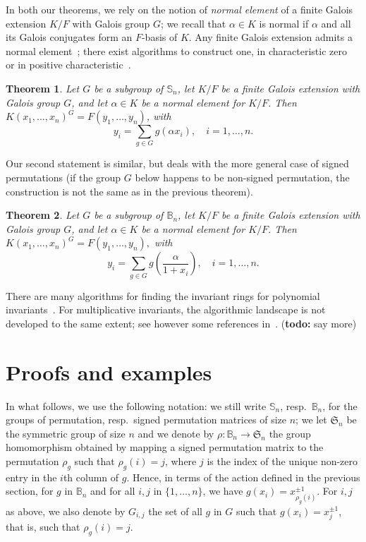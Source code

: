 \documentclass[12pt]{article}
\theoremstyle{plain}
\newtheorem{theorem}{Theorem}
\def\todo#1{(\textbf{todo:} #1)}
\begin{document}
In both our theorems, we rely on the notion of {\em normal element} of
a finite Galois extension $K/F$ with Galois group $G$; we recall that
$\alpha \in K$ is normal if $\alpha$ and all its Galois conjugates
form an $F$-basis of $K$.  Any finite Galois extension admits a normal
element~\cite[Theorem 6.13.1]{Lang}; there exist algorithms to
construct one, in characteristic zero~\cite{Girstmair} or in positive
characteristic~\cite{Giesbrecht,Poli}.

\begin{theorem}\label{nonamenonsign}
  Let $G$ be a subgroup of $\mathbb{S}_n$, let $K/F$ be a finite
  Galois extension with Galois group $G$, and let $\alpha \in K$ be a
  normal element for $K/F$. Then $ K(x_1,\ldots ,
  x_n)^G=F(y_1,\dots,y_n)$, with
  $$y_i =\sum_{g \in G} g(\alpha x_i), \quad i = 1,\dots,n.$$
\end{theorem}

Our second statement is similar, but deals with the more general case
of signed permutations (if the group $G$ below happens to be non-signed
permutation, the construction is not the same as in the previous theorem).

\begin{theorem}\label{nonamesign}
  Let $G$ be a subgroup of $\mathbb{B}_n$, let $K/F$ be a finite
  Galois extension with Galois group $G$, and let $\alpha \in K$ be a
  normal element for $K/F$. Then
  $K(x_1,\ldots, x_n)^G = F(y_1, \ldots, y_{n}),$
  with $$y_i = \sum_{g \in G} g\left (\frac{\alpha}{1+x_i}\right), \quad i = 1,\dots,n.$$
\end{theorem}

There are many algorithms for finding the invariant rings for
polynomial invariants~\cite{Sturmfels,Kemper2}. For multiplicative
invariants, the algorithmic landscape is not developed to the same
extent; see however some references in~\cite{Kemper,Lorenz,Renault}.
\todo{say more}


\section{Proofs and examples}


In what follows, we use the following notation: we still write
$\mathbb{S}_n$, resp.\ $\mathbb{B}_n$, for the groups of permutation,
resp.\ signed permutation matrices of size $n$; we let
$\mathfrak{S}_n$ be the symmetric group of size $n$ and we denote by
$\rho: \mathbb{B}_n \to \mathfrak{S}_n$ the group homomorphism
obtained by mapping a signed permutation matrix to the permutation
$\rho_g$ such that $\rho_g(i)=j$, where $j$ is the index of the
unique non-zero entry in the $i$th column of $g$.  Hence, in terms of
the action defined in the previous section, for $g$ in $\mathbb{B}_n$
and for all $i,j$ in $\{1,\dots,n\}$, we have $g(x_i) =
x_{\rho_g(i)}^{\pm 1}$.  For $i,j$ as above, we also denote by
$G_{i,j}$ the set of all $g$ in $G$ such that $g(x_i)=x^{\pm 1}_j$, that is,
such that $\rho_g(i)=j$.
\end{document}

